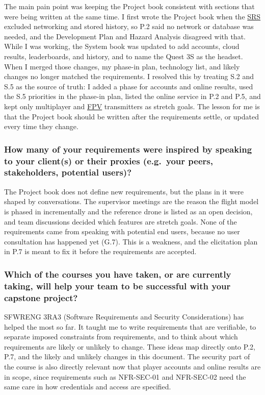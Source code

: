 \documentclass[12pt]{article}
\begin{document}
The main pain point was keeping the Project book consistent with sections
that were being written at the same time. I first wrote the Project book when
the \hyperlink{glos:SRS}{SRS} excluded networking and stored history, so P.2 said no network or
database was needed, and the Development Plan and Hazard Analysis disagreed
with that. While I was working, the System book was updated to add accounts,
cloud results, leaderboards, and history, and to name the Quest 3S as the
headset. When I merged those changes, my phase-in plan, technology list, and
likely changes no longer matched the requirements. I resolved this by
treating S.2 and S.5 as the source of truth: I added a phase for accounts and
online results, used the S.5 priorities in the phase-in plan, listed the
online service in P.2 and P.5, and kept only multiplayer and \hyperlink{glos:FPV}{FPV} transmitters
as stretch goals. The lesson for me is that the Project book should be
written after the requirements settle, or updated every time they change.

\subsubsection*{How many of your requirements were inspired by speaking to
your client(s) or their proxies (e.g.\ your peers, stakeholders, potential
users)?}

The Project book does not define new requirements, but the plans in it were
shaped by conversations. The supervisor meetings are the reason the flight
model is phased in incrementally and the reference drone is listed as an open
decision, and team discussions decided which features are stretch goals. None
of the requirements came from speaking with potential end users, because no
user consultation has happened yet (G.7). This is a weakness, and the
elicitation plan in P.7 is meant to fix it before the requirements are
accepted.

\subsubsection*{Which of the courses you have taken, or are currently taking,
will help your team to be successful with your capstone project?}

SFWRENG 3RA3 (Software Requirements and Security Considerations) has helped
the most so far. It taught me to write requirements that are verifiable, to
separate imposed constraints from requirements, and to think about which
requirements are likely or unlikely to change. These ideas map directly onto
P.2, P.7, and the likely and unlikely changes in this document. The security
part of the course is also directly relevant now that player accounts and
online results are in scope, since requirements such as NFR-SEC-01 and
NFR-SEC-02 need the same care in how credentials and access are specified.
\end{document}
